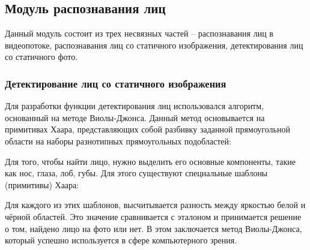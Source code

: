 \subsection{Модуль распознавания лиц}

Данный модуль состоит из трех несвязных частей -- распознавания лиц
в видеопотоке, распознавания лиц со статичного изображения, детектирования лиц
со статичного фото.

\subsubsection{Детектирование лиц со статичного изображения}

Для разработки функции детектирования лиц использовался алгоритм, основанный на
методе Виолы-Джонса. Данный метод основывается на примитивах Хаара,
представляющих собой разбивку заданной прямоугольной области на наборы
разнотипных прямоугольных подобластей:


Для того, чтобы найти лицо, нужно выделить его основные компоненты, такие как
нос, глаза, лоб, губы. Для этого существуют специальные шаблоны (примитивы)
Хаара:


Для каждого из этих шаблонов, высчитывается разность между яркостью белой
и чёрной областей. Это значение сравнивается с эталоном и принимается решение
о том, найдено лицо на фото или нет. В этом заключается метод Виолы-Джонса,
который успешно используется в сфере компьютерного зрения.

